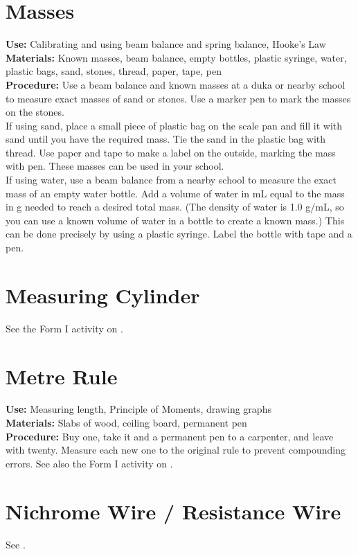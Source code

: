 \section{Masses}
\vspace{-10pt}
\textbf{Use:} Calibrating and using beam balance and spring balance, Hooke's Law\\
\textbf{Materials:} Known masses, beam balance, empty bottles, plastic syringe, water, plastic bags, sand, stones, thread, paper, tape, pen\\
\textbf{Procedure:} Use a beam balance and known masses at a duka or nearby school to measure exact masses of sand or stones.  Use a marker pen to mark the masses on the stones. \\
If using sand, place a small piece of plastic bag on the scale pan and fill it with sand until you have the required mass.  Tie the sand in the plastic bag with thread.  Use paper and tape to make a label on the outside, marking the mass with pen.  These masses can be used in your school.\\
If using water, use a beam balance from a nearby school to measure the exact mass of an empty water bottle. Add a volume of water in mL equal to the mass in g needed to reach a desired total mass. (The density of water is 1.0 g/mL, so you can use a known volume of water in a bottle to create a known mass.) This can be done precisely by using a plastic syringe. Label the bottle with tape and a pen.

\section{Measuring Cylinder}
See the Form I activity on .

\section{Metre Rule}
\vspace{-10pt}
\textbf{Use:} Measuring length, Principle of Moments, drawing graphs\\
\textbf{Materials:} Slabs of wood, ceiling board, permanent pen\\
\textbf{Procedure:} Buy one, take it and a permanent pen to a carpenter, and leave with twenty. Measure each new one to the original rule to prevent compounding errors. See also the Form I activity on .

\section{Nichrome Wire / Resistance Wire}
\vspace{-10pt}
See .

